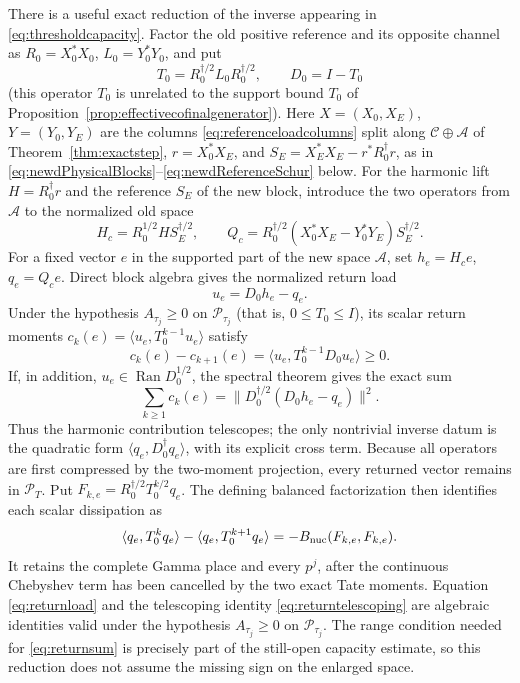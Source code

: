 \documentclass[11pt]{amsart}
\theoremstyle{definition}
\theoremstyle{remark}
\begin{document}
There is a useful exact reduction of the inverse appearing in
\eqref{eq:thresholdcapacity}.  Factor the old positive reference and its
opposite channel as \(R_0=X_0^*X_0\), \(L_0=Y_0^*Y_0\), and put
\[
 T_0=R_0^{\dagger/2}L_0R_0^{\dagger/2},\qquad D_0=I-T_0
\]
(this operator \(T_0\) is unrelated to the support bound \(T_0\) of
Proposition~\ref{prop:effectivecofinalgenerator}).  Here \(X=(X_0,X_E)\),
\(Y=(Y_0,Y_E)\) are the columns \eqref{eq:referenceloadcolumns} split along
\(\mathcal C\oplus\mathcal A\) of Theorem~\ref{thm:exactstep},
\(r=X_0^*X_E\), and \(S_E=X_E^*X_E-r^*R_0^\dagger r\), as in
\eqref{eq:newdPhysicalBlocks}--\eqref{eq:newdReferenceSchur} below.
For the harmonic lift \(H=R_0^\dagger r\) and the reference \(S_E\) of the
new block, introduce the two operators from \(\mathcal A\) to the
normalized old space
\[
 H_c=R_0^{1/2}HS_E^{\dagger/2},\qquad
 Q_c=R_0^{\dagger/2}(X_0^*X_E-Y_0^*Y_E)S_E^{\dagger/2}.
\]
For a fixed vector \(e\) in the supported part of the new space \(\mathcal A\), set
\(h_e=H_ce\), \(q_e=Q_ce\).  Direct block algebra gives the normalized
return load
\begin{equation}\label{eq:returnload}
 u_e=D_0h_e-q_e.
\end{equation}
Under the hypothesis \(A_{\tau_j}\ge0\) on \(\mathcal P_{\tau_j}\) (that
is, \(0\le T_0\le I\)), its scalar return moments
\(c_k(e)=\langle u_e,T_0^{k-1}u_e\rangle\) satisfy
\begin{equation}\label{eq:returntelescoping}
 c_k(e)-c_{k+1}(e)
 =\langle u_e,T_0^{k-1}D_0u_e\rangle\ge0.
\end{equation}
If, in addition, \(u_e\in\operatorname{Ran}D_0^{1/2}\), the spectral
theorem gives the exact sum
\begin{equation}\label{eq:returnsum}
 \sum_{k\ge1}c_k(e)
 =\|D_0^{\dagger/2}(D_0h_e-q_e)\|^2.
\end{equation}
Thus the harmonic contribution telescopes; the only nontrivial inverse
datum is the quadratic form
\(\langle q_e,D_0^\dagger q_e\rangle\), with its explicit cross term.
Because all operators are first compressed by the two-moment projection,
every returned vector remains in \(\mathcal P_T\).  Put
\(F_{k,e}=R_0^{\dagger/2}T_0^{k/2}q_e\).  The defining balanced
factorization then identifies each scalar dissipation as
\begin{equation}\label{eq:returnDissipation}
 \langle q_e,T_0^kq_e\rangle-\langle q_e,T_0^{k+1}q_e\rangle
 =-B_{\rm nuc}(F_{k,e},F_{k,e}).
\end{equation}
It retains the complete Gamma place and every \(p^j\), after the continuous
Chebyshev term has been cancelled by the two exact Tate moments.  Equation
\eqref{eq:returnload} and the telescoping identity
\eqref{eq:returntelescoping} are algebraic identities valid under
the hypothesis \(A_{\tau_j}\ge0\) on \(\mathcal P_{\tau_j}\).  The range condition needed for
\eqref{eq:returnsum} is precisely part of the still-open capacity estimate,
so this reduction does not assume the missing sign on the enlarged space.
\end{document}
